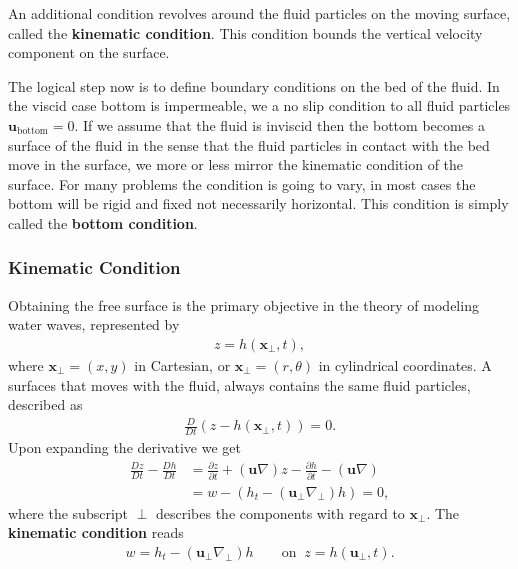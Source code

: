 An additional condition revolves around the fluid particles on the moving
surface, called the \textbf{kinematic condition}. This condition bounds
the vertical velocity component on the surface.

The logical step now is to define boundary conditions on the bed of the
fluid. In the viscid case bottom is impermeable, we a no
slip condition to all fluid particles $\mathbf{u}_\text{bottom}= 0$. If we
assume that the fluid is inviscid then the bottom becomes a surface of the
fluid in the sense that the fluid particles in contact with the bed move in
the surface, we more or less mirror the kinematic condition of the surface.
For many problems the condition is going to vary, in most cases the bottom
will be rigid and fixed not necessarily horizontal. This condition is simply
called the \textbf{bottom condition}.
\subsubsection{Kinematic Condition}
Obtaining the free surface is the primary objective in the theory of modeling
water waves, represented by
\begin{align}
    z = h(\mathbf{x}_\perp, t),
\end{align}
where $\mathbf{x}_\perp = (x, y)$ in Cartesian, or $\mathbf{x}_\perp = (r,
\theta)$ in cylindrical coordinates. A surfaces that moves with the fluid,
always contains the same fluid particles, described as
\begin{align}
    \frac{D}{Dt}\left(z - h(\mathbf{x}_\perp, t ) \right) = 0.
\end{align}
Upon expanding the derivative we get
\begin{align}
    \frac{Dz}{Dt} - \frac{Dh}{Dt}
    &= \frac{\partial z}{\partial t}+
    (\mathbf{u}\nabla)z - \frac{\partial h}{\partial t} -(\mathbf{u}\nabla)\\
    &= w - \left(h_t - (\mathbf{u}_\perp \nabla_\perp) h\right) = 0,
\end{align}
where the subscript $\perp$ describes the components with regard to
$\mathbf{x}_\perp$. The \textbf{kinematic condition} reads
\begin{align}
    w = h_t - (\mathbf{u}_\perp \nabla_\perp) h \qquad \text{on}\;\;
    z=h(\mathbf{u}_\perp, t).
\end{align}


